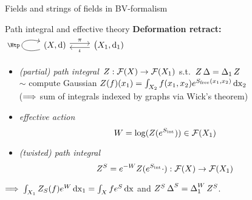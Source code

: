 \documentclass[xcolor=dvipsnames]{beamer}
\theoremstyle{plain}
\renewcommand{\emph}[1]{{\itshape\color{pink}#1}}
\newcommand{\emphbf}[1]{{\bfseries\color{YellowGreen}#1}}
\begin{document}
\begin{frame}{Fields and strings of fields in BV-formalism}

%
%
%
\end{frame}


\begin{frame}[fragile]{Path integral and effective theory}
\emphbf{Deformation retract:} $\begin{tikzcd}
(X,\Dd) \arrow[loop left]{l}{\Htp}\arrow[shift left]{r}{\pi} & \arrow[shift left]{l}{\iota} \bigl(X_1,\Dd_1)
\end{tikzcd}$\pause
\begin{itemize}
\item \emph{(partial) path integral}~$Z: \mathcal{F}(X) \rightarrow \mathcal{F}(X_1)$ s.t.\!~$Z \operatorname{\Delta}  = \operatorname{\Delta}_1 Z$ \\
$\sim$ compute Gaussian $Z(f)(x_1)=\int_{X_2} f(x_1,x_2) e^{S_{\text{free}}(x_1,x_2)}\operatorname{dx}_2$\\
($\Longrightarrow$ sum of integrals indexed by graphs via Wick's theorem)
\item \emph{effective action} $$W = \log( Z(e^{S_{\text{int}}})) \in \mathcal{F}(X_1)$$
\item \emph{(twisted) path integral} 
$$Z^S = e^{-W} Z(e^{S_{\text{int}}}\cdot): \mathcal{F}(X) \rightarrow \mathcal{F}(X_1)$$
\end{itemize}\pause
\vspace{.3cm}
$\Longrightarrow$ $\int_{X_1} Z_S(f)e^{W}\operatorname{dx}_1= \int_{X} f e^{S} \operatorname{dx}$ and $Z^S \operatorname{\Delta}^S = \operatorname{\Delta}^W_1 Z^S$.
\end{frame}
\end{document}
